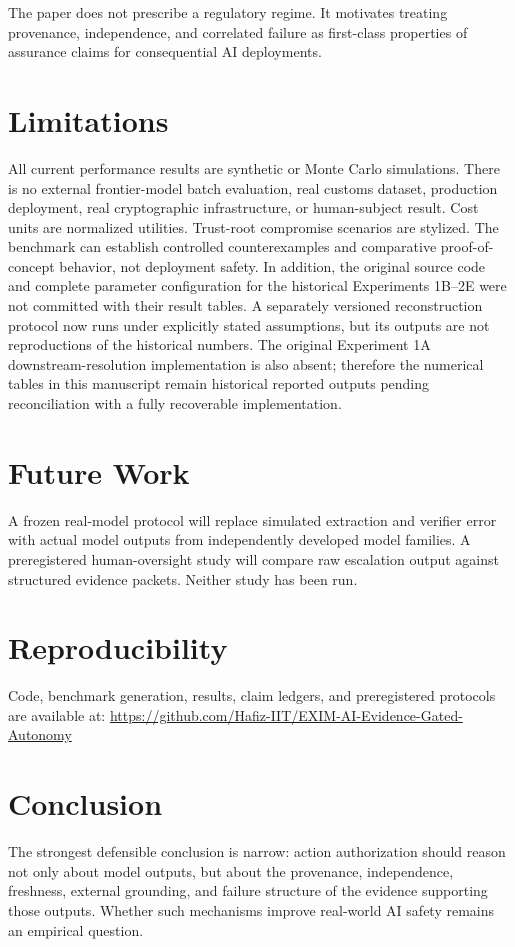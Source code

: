 \documentclass[11pt]{article}
\begin{document}
The paper does not prescribe a regulatory regime. It motivates treating provenance, independence, and correlated failure as first-class properties of assurance claims for consequential AI deployments.

\section{Limitations}
All current performance results are synthetic or Monte Carlo simulations. There is no external frontier-model batch evaluation, real customs dataset, production deployment, real cryptographic infrastructure, or human-subject result. Cost units are normalized utilities. Trust-root compromise scenarios are stylized. The benchmark can establish controlled counterexamples and comparative proof-of-concept behavior, not deployment safety. In addition, the original source code and complete parameter configuration for the historical Experiments 1B--2E were not committed with their result tables. A separately versioned reconstruction protocol now runs under explicitly stated assumptions, but its outputs are not reproductions of the historical numbers. The original Experiment 1A downstream-resolution implementation is also absent; therefore the numerical tables in this manuscript remain historical reported outputs pending reconciliation with a fully recoverable implementation.

\section{Future Work}
A frozen real-model protocol will replace simulated extraction and verifier error with actual model outputs from independently developed model families. A preregistered human-oversight study will compare raw escalation output against structured evidence packets. Neither study has been run.

\section{Reproducibility}
Code, benchmark generation, results, claim ledgers, and preregistered protocols are available at:
\url{https://github.com/Hafiz-IIT/EXIM-AI-Evidence-Gated-Autonomy}

\section{Conclusion}
The strongest defensible conclusion is narrow: action authorization should reason not only about model outputs, but about the provenance, independence, freshness, external grounding, and failure structure of the evidence supporting those outputs. Whether such mechanisms improve real-world AI safety remains an empirical question.
\end{document}
